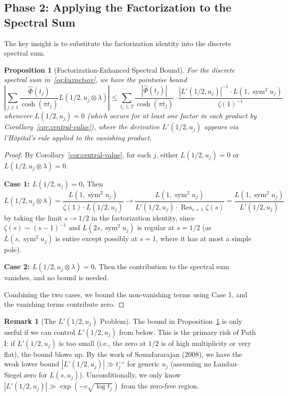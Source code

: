\documentclass[11pt,a4paper]{article}
\theoremstyle{plain}
\newtheorem{proposition}[theorem]{Proposition}
\theoremstyle{definition}
\newtheorem{remark}[theorem]{Remark}
\newcommand{\sym}{\operatorname{sym}}
\newcommand{\Res}{\operatorname{Res}}
\begin{document}
\subsection{Phase 2: Applying the Factorization to the Spectral Sum}

The key insight is to substitute the factorization identity into the discrete spectral sum.

\begin{proposition}[Factorization-Enhanced Spectral Bound]\label{prop:factor-enhanced}
For the discrete spectral sum in~\eqref{eq:kuznetsov}, we have the pointwise bound
\begin{equation}\label{eq:disc-bound}
\left|\sum_{j \geq 1} \frac{\hat{\Phi}(t_j)}{\cosh(\pi t_j)} L(1/2, u_j \otimes \lambda)\right| \leq \sum_{t_j \leq T} \frac{|\hat{\Phi}(t_j)|}{\cosh(\pi t_j)} \cdot \frac{|L'(1/2, u_j)|^{-1} \cdot L(1, \sym^2 u_j)}{\zeta(1)^{-1}}
\end{equation}
whenever $L(1/2, u_j) = 0$ (which occurs for at least one factor in each product by Corollary~\ref{cor:central-value}), where the derivative $L'(1/2, u_j)$ appears via l'H\^{o}pital's rule applied to the vanishing product.
\end{proposition}

\begin{proof}
By Corollary~\ref{cor:central-value}, for each $j$, either $L(1/2, u_j) = 0$ or $L(1/2, u_j \otimes \lambda) = 0$.

\textbf{Case 1: $L(1/2, u_j) = 0$.} Then
\[
L(1/2, u_j \otimes \lambda) = \frac{L(1, \sym^2 u_j)}{\zeta(1) \cdot L(1/2, u_j)} \to \frac{L(1, \sym^2 u_j)}{L'(1/2, u_j) \cdot \Res_{s=1}\zeta(s)} = \frac{L(1, \sym^2 u_j)}{L'(1/2, u_j)}
\]
by taking the limit $s \to 1/2$ in the factorization identity, since $\zeta(s) \sim (s-1)^{-1}$ and $L(2s, \sym^2 u_j)$ is regular at $s = 1/2$ (as $L(s, \sym^2 u_j)$ is entire except possibly at $s = 1$, where it has at most a simple pole).

\textbf{Case 2: $L(1/2, u_j \otimes \lambda) = 0$.} Then the contribution to the spectral sum vanishes, and no bound is needed.

Combining the two cases, we bound the non-vanishing terms using Case 1, and the vanishing terms contribute zero.
\end{proof}

\begin{remark}[The $L'(1/2, u_j)$ Problem]
The bound in Proposition~\ref{prop:factor-enhanced} is only useful if we can control $L'(1/2, u_j)$ from below. This is the primary risk of Path I: if $L'(1/2, u_j)$ is too small (i.e., the zero at $1/2$ is of high multiplicity or very flat), the bound blows up. By the work of Soundararajan (2008), we have the weak lower bound $|L'(1/2, u_j)| \gg t_j^{-\varepsilon}$ for generic $u_j$ (assuming no Landau--Siegel zero for $L(s, u_j)$). Unconditionally, we only know $|L'(1/2, u_j)| \gg \exp(-c \sqrt{\log t_j})$ from the zero-free region.
\end{remark}
\end{document}
